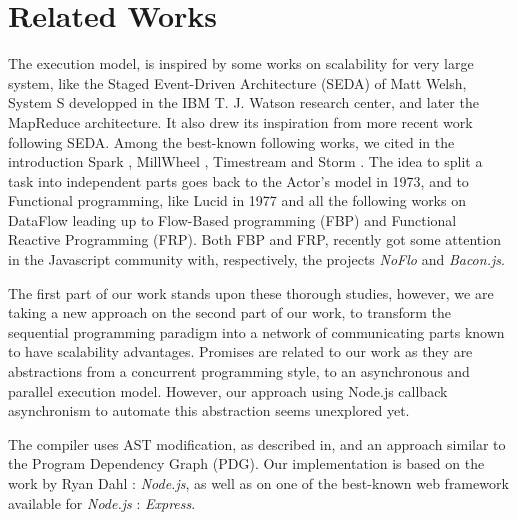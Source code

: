 \section{Related Works} \label{section:related}

The execution model, is inspired by some works on scalability for very large system, like the Staged Event-Driven Architecture (SEDA) of Matt Welsh\cite{Welsh2000}, System S developped in the IBM T. J. Watson research center\cite{Jain2006,Wu2007}, and later the MapReduce architecture\cite{Dean2008}.
It also drew its inspiration from more recent work following SEDA.
Among the best-known following works, we cited in the introduction Spark \cite{Zaharia2010}, MillWheel \cite{Akidau2013}, Timestream \cite{Qian2013} and Storm \cite{Marz2011}.
The idea to split a task into independent parts goes back to the Actor's model\cite{Hewitt1973} in 1973, and to Functional programming, like Lucid\cite{Ashcroft1977} in 1977 and all the following works on DataFlow leading up to Flow-Based programming (FBP)\cite{Morrison1994a} and Functional Reactive Programming (FRP)\cite{Elliott1997}.
Both FBP and FRP, recently got some attention in the Javascript community with, respectively, the projects \textit{NoFlo}\cite{NoFlo} and \textit{Bacon.js}\cite{Paananen2012}.

The first part of our work stands upon these thorough studies, however, we are taking a new approach on the second part of our work, to transform the sequential programming paradigm into a network of communicating parts known to have scalability advantages.
Promises\cite{Liskov1988} are related to our work as they are abstractions from a concurrent programming style, to an asynchronous and parallel execution model.
However, our approach using Node.js callback asynchronism to automate this abstraction seems unexplored yet.

The compiler uses AST modification, as described in\cite{Jones2003}, and an approach similar to the Program Dependency Graph (PDG)\cite{Ferrante1987}.
Our implementation is based on the work by Ryan Dahl : \textit{Node.js}\cite{Dahl}, as well as on one of the best-known web framework available for \textit{Node.js} : \textit{Express}\cite{express}.